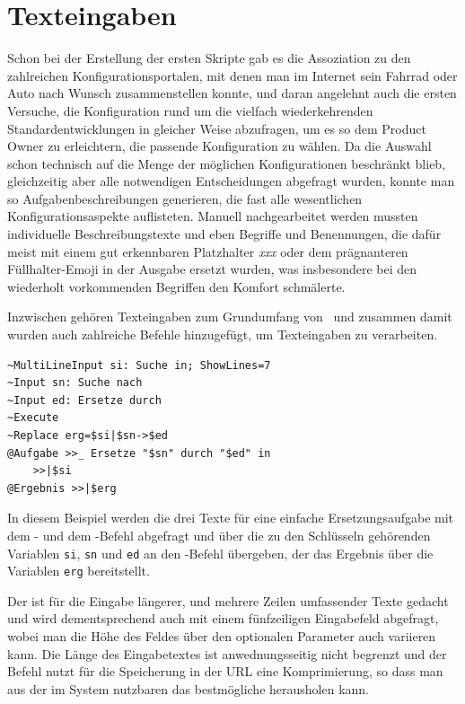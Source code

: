\section{Texteingaben}\label{Texteingaben}
Schon bei der Erstellung der ersten Skripte gab es die Assoziation zu den zahlreichen Konfigurationsportalen, mit denen man im Internet sein Fahrrad oder Auto nach Wunsch zusammenstellen konnte, und daran angelehnt auch die ersten Versuche, die Konfiguration rund um die vielfach wiederkehrenden Standardentwicklungen in gleicher Weise abzufragen, um es so dem Product Owner zu erleichtern, die passende Konfiguration zu wählen. Da die Auswahl schon technisch auf die Menge der möglichen Konfigurationen beschränkt blieb, gleichzeitig aber alle notwendigen Entscheidungen abgefragt wurden, konnte man so Aufgabenbeschreibungen generieren, die fast alle wesentlichen Konfigurationsaspekte auf\-listeten. Manuell nachgearbeitet werden mussten individuelle Beschreibungstexte und eben Begriffe und Benennungen, die dafür meist mit einem gut erkennbaren Platzhalter \emph{xxx} oder dem prägnanteren Füllhalter-Emoji in der Ausgabe ersetzt wurden, was insbesondere bei den wiederholt vorkommenden Begriffen den Komfort schmälerte.

Inzwischen gehören Texteingaben zum Grundumfang von \FPZ\ und zusammen damit wurden auch zahlreiche Befehle hinzugefügt, um Texteingaben zu verarbeiten.

\label{BspTextersetzung}
\begin{verbatim}
~MultiLineInput si: Suche in; ShowLines=7
~Input sn: Suche nach
~Input ed: Ersetze durch
~Execute
~Replace erg=$si|$sn->$ed
@Aufgabe >>_ Ersetze "$sn" durch "$ed" in
    >>|$si
@Ergebnis >>|$erg
\end{verbatim}

In diesem Beispiel werden die drei Texte für eine einfache Ersetzungsaufgabe mit dem - und dem -Befehl abgefragt und über die zu den Schlüsseln gehörenden Variablen \verb|si|, \verb|sn| und \verb|ed| an den -Befehl übergeben, der das Ergebnis über die Variablen \verb|erg| bereitstellt.

Der  ist für die Eingabe längerer, und mehrere Zeilen umfassender Texte gedacht und wird dementsprechend auch mit einem fünfzeiligen Eingabefeld abgefragt, wobei man die Höhe des Feldes über den optionalen Parameter  auch variieren kann. Die Länge des Eingabetextes ist anwednungsseitig nicht begrenzt und der Befehl nutzt für die Speicherung in der URL eine Komprimierung, so dass man aus der im System nutzbaren  das bestmögliche herausholen kann.

